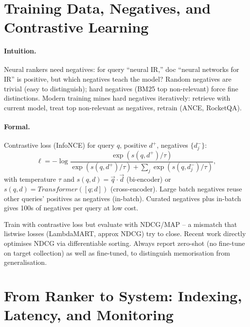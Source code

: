 
\section{Training Data, Negatives, and Contrastive Learning}\label{sec:contrastive}
\paragraph{Intuition.} Neural rankers need negatives: for query ``neural IR,'' doc ``neural networks for IR'' is positive, but which negatives teach the model? Random negatives are trivial (easy to distinguish); hard negatives (BM25 top non-relevant) force fine distinctions. Modern training mines hard negatives iteratively: retrieve with current model, treat top non-relevant as negatives, retrain (ANCE, RocketQA).

\paragraph{Formal.} Contrastive loss (InfoNCE) for query $q$, positive $d^+$, negatives $\{d^-_j\}$:
\begin{equation}
\ell = -\log\frac{\exp(s(q,d^+)/\tau)}{\exp(s(q,d^+)/\tau)+\sum_j\exp(s(q,d^-_j)/\tau)},
\end{equation}
with temperature $\tau$ and $s(q,d)=\vec{q}\cdot\vec{d}$ (bi-encoder) or $s(q,d)=Transformer([q;d])$ (cross-encoder). Large batch negatives reuse other queries' positives as negatives (in-batch). Curated negatives plus in-batch gives 100s of negatives per query at low cost.

\begin{remark}
Train with contrastive loss but evaluate with NDCG/MAP -- a mismatch that listwise losses (LambdaMART, approx NDCG) try to close. Recent work directly optimises NDCG via differentiable sorting. Always report zero-shot (no fine-tune on target collection) as well as fine-tuned, to distinguish memorisation from generalisation.
\end{remark}


\section{From Ranker to System: Indexing, Latency, and Monitoring}\label{sec:system}
